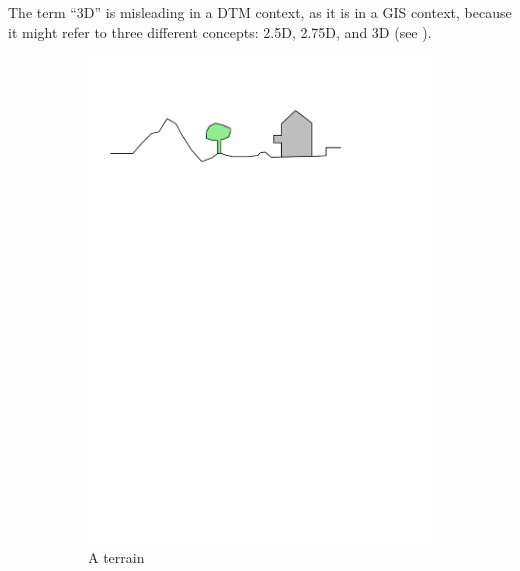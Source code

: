 The term ``3D'' is misleading in a DTM context, as it is in a GIS context, 
because it might refer to three different concepts: 2.5D, 2.75D, and 3D (see ).
\begin{figure}[b]
  \centering
  \begin{subfigure}[b]{0.45\linewidth}
    \centering
    \includegraphics[page=1,width=\linewidth]{figs/dimgis}
    \caption{A terrain}
  \end{subfigure}%
  \qquad %
  \begin{subfigure}[b]{0.45\linewidth}
    \centering

\end{subfigure}
\end{figure}
